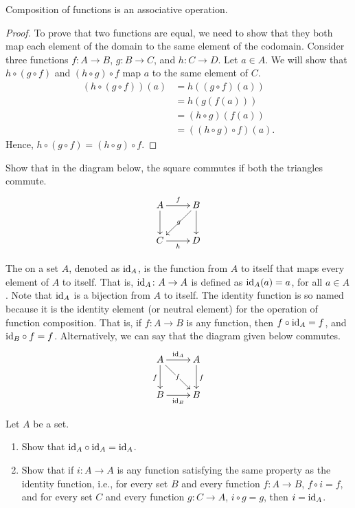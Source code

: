 \begin{Theorem}\label{thm:FuncCompAssoc}
Composition of functions is an associative operation.
\end{Theorem}

\begin{proof}
To prove that two functions are equal, we need to show that they both map each element of the domain to the same element of the codomain. Consider three functions $f \colon A \to B$, $g \colon B \to C$, and $h \colon C \to D$. Let $a \in A$. We will show that $h \circ (g \circ f)$ and $(h \circ g) \circ f$ map $a$ to the same element of $C$.
\begin{align*}
(h \circ (g \circ f))(a) & = h((g \circ f)(a)) \\
    & = h(g(f(a))) \\
    & = (h \circ g)(f(a)) \\
    & = ((h \circ g) \circ f)(a).
\end{align*}
Hence, $h \circ (g \circ f) = (h \circ g) \circ f$.
\end{proof}

\begin{Exercise}
Show that in the diagram below, the square commutes if both the triangles commute.
\begin{equation*}
\xymatrix{
A \ar[r]^f \ar[d] & B \ar[dl]|-g \ar[d]\\
C \ar[r]_h & D
}
\end{equation*}
\end{Exercise}

The  on a set $A$, denoted as $\mathrm{id}_A$, is the function from $A$ to itself that maps every element of $A$ to itself. That is, $\mathrm{id}_A \colon A \to A$ is defined as $\mathrm{id}_A(a) = a$, for all $a \in A$. Note that $\mathrm{id}_A$ is a bijection from $A$ to itself. The identity function is so named because it is the identity element (or neutral element) for the operation of function composition. That is, if $f \colon A \to B$ is any function, then $f \circ \mathrm{id}_A = f$, and $\mathrm{id}_B \circ f = f$. Alternatively, we can say that the diagram given below commutes.
\begin{equation*}
\xymatrix{
A \ar[d]_{f} \ar[r]^{\id_A} \ar[dr]|-f & A \ar[d]^{f}\\
B \ar[r]_{\id_B} & B
}
\end{equation*}

\begin{Exercise}
Let $A$ be a set.
\begin{enumerate}
\item Show that $\mathrm{id}_A \circ \mathrm{id}_A = \mathrm{id}_A$.
\item Show that if $i \colon A \to A$ is any function satisfying the same property as the identity function, i.e., for every set $B$ and every function $f \colon A \to B$, $f \circ i = f$, and for every set $C$ and every function $g \colon C \to A$, $i \circ g = g$,  then $i = \mathrm{id}_A$.
\end{enumerate}
\end{Exercise}

